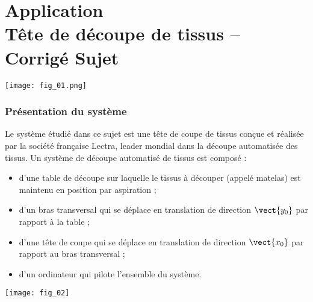 \chapter*{Application  \\ 
Tête de découpe de tissus -- \ifprof Corrigé \else Sujet \fi}

\iflivret {} \else
\ifprof  {} \else \fi
\fi


\marginnote[1cm]{
}


\begin{marginfigure}
\texttt{[image: fig\_01.png]}
\end{marginfigure}




\subsection*{Présentation du système}
\ifprof
\else
Le système étudié dans ce sujet est une tête de coupe de tissus conçue et réalisée par la société
française Lectra, leader mondial dans la découpe automatisée des tissus.
Un système de découpe automatisé de tissus est composé :
\begin{itemize}
\item d'une table de découpe sur laquelle le tissus à découper (appelé matelas) est maintenu en position
par aspiration ;
\item d'un bras transversal qui se déplace en translation de direction $\vect{y_0}$ par rapport à la table ;
\item d'une tête de coupe qui se déplace en translation de direction $\vect{x_0}$ par rapport au bras transversal ;
\item d'un ordinateur qui pilote l’ensemble du système. 
\end{itemize}

\begin{marginfigure}
\texttt{[image: fig\_02]}
\end{marginfigure}


